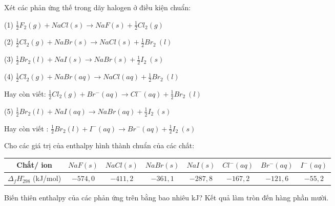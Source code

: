 \documentclass[Main.tex]{subfiles}
\begin{document}
	\begin{bt}
		Xét các phản ứng thế trong dãy halogen ở điều kiện chuẩn:
		
		(1) $\frac{1}{2} F_2(g) + NaCl(s) \longrightarrow NaF(s) + \frac{1}{2} Cl_2(g)$
		
		(2) $\frac{1}{2} Cl_2(g) + NaBr(s) \longrightarrow NaCl(s) + \frac{1}{2} Br_2 \ (l)$
		
		(3) $\frac{1}{2} Br_2(l) + NaI(s) \longrightarrow NaBr (s) + \frac{1}{2} I_2 \ (s)$
		
		(4) $\frac{1}{2} Cl_2(g) + NaBr(aq) \longrightarrow NaCl(aq) + \frac{1}{2} Br_2 \ (l)$
		
		Hay còn viết: $\frac{1}{2} Cl_2(g) + Br^- (aq) \longrightarrow Cl^- (aq) + \frac{1}{2} Br_2 \ (l)$
		
		(5) $\frac{1}{2} Br_2(l) + NaI(aq) \longrightarrow NaBr (aq) + \frac{1}{2} I_2 \ (s)$
		
		Hay còn viết : $\frac{1}{2} Br_2(l) + I^- (aq) \longrightarrow Br^- (aq) + \frac{1}{2} I_2 \ (s)$
		
		Cho các giá trị của enthalpy hình thành chuẩn của các chất:
		\begin{center}
			\begin{tabular}{|c|c|c|c|c|c|c|c|}
				\hline
				Chất/ ion & $NaF(s)$ & $NaCl(s)$ & $NaBr(s)$ & $NaI(s)$ & $Cl^-(aq)$ & $Br^-(aq)$ & $I^-(aq)$ \\				
				\hline
				$\Delta_f H_{298}^\circ$ (kJ/mol) & $-574{,}0$ & $-411{,}2$ & $-361{,}1$ & $-287{,}8$ & $-167{,}2$ & $-121{,}6$ & $-55{,}2$ \\
				\hline
			\end{tabular}
		\end{center}
		Biến thiên enthalpy của các phản ứng trên bằng bao nhiêu kJ? Kết quả làm tròn đến hàng phần mười.
	\end{bt}
\end{document}
